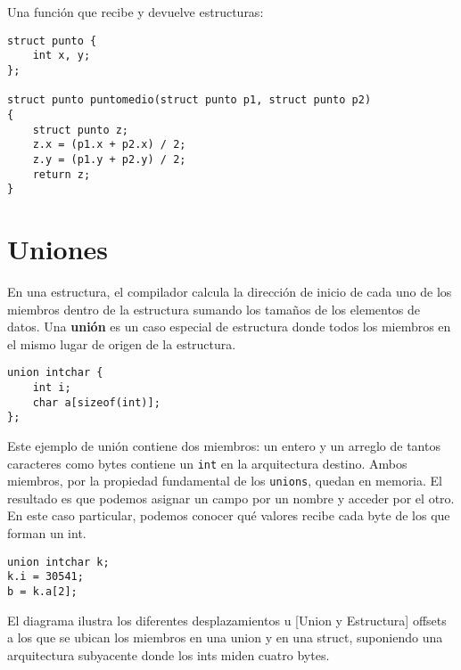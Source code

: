\begin{ejemplo}
Una función que recibe y devuelve estructuras:
\begin{lstlisting}
struct punto {
    int x, y;
};

struct punto puntomedio(struct punto p1, struct punto p2)
{
    struct punto z;
    z.x = (p1.x + p2.x) / 2;
    z.y = (p1.y + p2.y) / 2;
    return z;
}
\end{lstlisting}
\end{ejemplo}

\section{Uniones}
En una estructura, el compilador calcula la dirección de inicio de cada uno de
los miembros dentro de la estructura sumando los tamaños de los elementos de
datos. Una \textbf{unión} es un caso especial de estructura donde todos los miembros
 en el mismo lugar de origen de la estructura.
\begin{lstlisting}
union intchar {
    int i;
    char a[sizeof(int)];
};
\end{lstlisting}
Este ejemplo de unión contiene dos miembros: un entero y un arreglo de tantos
caracteres como bytes contiene un \lstinline{int} en la arquitectura destino. Ambos
miembros, por la propiedad fundamental de los \lstinline{unions}, quedan  en
memoria. El resultado es que podemos asignar un campo por un nombre y acceder
por el otro. En este caso particular, podemos conocer qué valores recibe cada
byte de los que forman un int.
\begin{lstlisting}
union intchar k;
k.i = 30541;
b = k.a[2];
\end{lstlisting}

      El diagrama ilustra los diferentes desplazamientos u [Union y Estructura]
offsets a los que se ubican los miembros en una union y en
  una struct, suponiendo una arquitectura subyacente donde
                              los ints miden cuatro bytes.

